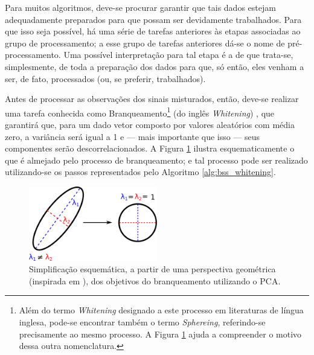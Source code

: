 
Para muitos algoritmos, deve-se procurar garantir que tais dados estejam adequadamente preparados para que possam ser devidamente trabalhados. Para que isso seja possível, há uma série de tarefas anteriores às etapas associadas ao grupo de processamento; a esse grupo de tarefas anteriores dá-se o nome de pré-processamento. Uma possível interpretação para tal etapa é a de que trata-se, simplesmente, de toda a preparação dos dados para que, só então, eles venham a ser, de fato, processados (ou, se preferir, trabalhados).

Antes de processar as observações dos sinais misturados, então, deve-se realizar uma tarefa conhecida como Branqueamento\footnote{Além do termo \textit{Whitening} designado a este processo em literaturas de língua inglesa, pode-se encontrar também o termo \textit{Sphereing}, referindo-se precisamente ao mesmo processo. A Figura \ref{fig:bss_pca_whitening} ajuda a compreender o motivo dessa outra nomenclatura.} (do inglês \textit{Whitening}) \citep{BELL19973327, koivunen1999feasibility}, que garantirá que, para um dado vetor composto por valores aleatórios com média zero, a variância será igual a 1 e --- mais importante que isso --- seus componentes serão descorrelacionados. A Figura \ref{fig:bss_pca_whitening} ilustra esquematicamente o que é almejado pelo processo de branqueamento; e tal processo pode ser realizado utilizando-se os passos representados pelo Algoritmo \ref{alg:bss_whitening}.

\begin{figure}[H]
    \centering
    \includegraphics[width=0.5\textwidth]{figs/pca_whitening.pdf}
    \caption{Simplificação esquemática, a partir de uma perspectiva geométrica (inspirada em \citep{zafeiriou2015notes}), dos objetivos do branqueamento utilizando o PCA.}
    \label{fig:bss_pca_whitening}
\end{figure}




